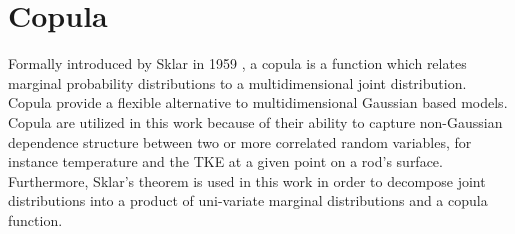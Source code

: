 




\section{Copula}

Formally introduced by Sklar in 1959 \cite{Sklar1959}, a copula is a function which relates marginal probability distributions to a multidimensional joint distribution.  Copula provide a flexible alternative to multidimensional Gaussian based models.  Copula are utilized in this work because of their ability to capture non-Gaussian dependence structure between two or more correlated random variables, for instance temperature and the TKE at a given point on a rod's surface.  Furthermore, Sklar's theorem is used in this work in order to decompose joint distributions into a product of uni-variate marginal distributions and a copula function.  

